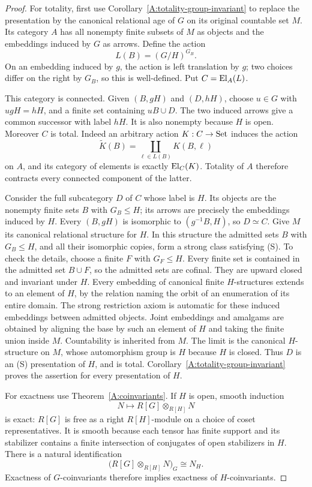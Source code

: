 \begin{proof}
For totality, first use Corollary~\ref{A:totality-group-invariant}
to replace the presentation by the canonical relational age of
$G$ on its original countable set $M$. Its category $A$ has all
nonempty finite subsets of $M$ as objects and the embeddings
induced by $G$ as arrows. Define the action
\[
 L(B)=(G/H)^{G_B}.
\]
On an embedding induced by $g$, the action is left translation
by $g$; two choices differ on the right by $G_B$, so this is
well-defined. Put $C=\operatorname{El}_A(L)$.

This category is connected. Given $(B,gH)$ and $(D,hH)$,
choose $u\in G$ with $ugH=hH$, and a finite set containing
$uB\cup D$. The two induced arrows give a common successor
with label $hH$. It is also nonempty because $H$ is open.
Moreover $C$ is total. Indeed an arbitrary action $K:C\to\mathrm{Set}$
induces the action
\[
 \widetilde K(B)=\coprod_{\ell\in L(B)}K(B,\ell)
\]
on $A$, and its category of elements is exactly $\operatorname{El}_C(K)$.
Totality of $A$ therefore contracts every connected component
of the latter.

Consider the full subcategory $D$ of $C$ whose label is $H$.
Its objects are the nonempty finite sets $B$ with $G_B\leq H$;
its arrows are precisely the embeddings induced by $H$.
Every $(B,gH)$ is isomorphic to $(g^{-1}B,H)$, so $D\simeq C$.
Give $M$ its canonical relational structure for $H$. In this
structure the admitted sets $B$ with $G_B\leq H$, and all their
isomorphic copies, form a strong class satisfying \textup{(S)}.
To check the details, choose a finite $F$ with $G_F\leq H$.
Every finite set is contained in the admitted set $B\cup F$,
so the admitted sets are cofinal. They are upward closed and
invariant under $H$. Every embedding of canonical finite
$H$-structures extends to an element of $H$, by the relation
naming the orbit of an enumeration of its entire domain.
The strong restriction axiom is automatic for these induced
embeddings between admitted objects. Joint embeddings and
amalgams are obtained by aligning the base by such an element
of $H$ and taking the finite union inside $M$. Countability
is inherited from $M$. The limit is the canonical $H$-structure
on $M$, whose automorphism group is $H$ because $H$ is closed.
Thus $D$ is an \textup{(S)} presentation of $H$, and is total.
Corollary~\ref{A:totality-group-invariant} proves the assertion
for every presentation of $H$.

For exactness use Theorem~\ref{A:coinvariants}. If $H$ is
open, smooth induction
\[
 N\longmapsto R[G]\otimes_{R[H]}N
\]
is exact: $R[G]$ is free as a right $R[H]$-module on a choice
of coset representatives. It is smooth because each tensor
has finite support and its stabilizer contains a finite
intersection of conjugates of open stabilizers in $H$.
There is a natural identification
\[
 \bigl(R[G]\otimes_{R[H]}N\bigr)_G\cong N_H.
\]
Exactness of $G$-coinvariants therefore implies exactness of
$H$-coinvariants.


\end{proof}
